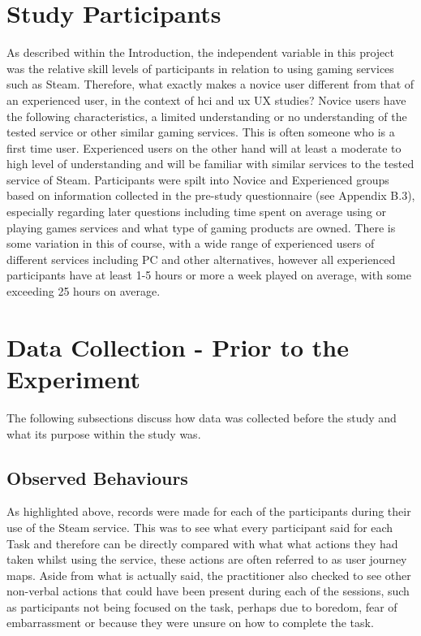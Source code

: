 \section{Study Participants}
As described within the Introduction, the independent variable in this project was the relative skill levels of participants in relation to using gaming services such as Steam. Therefore, what exactly makes a novice user different from that of an experienced user, in the context of \gls{hci} and \gls{ux} UX studies? Novice users have the following characteristics, a limited understanding or no understanding of the tested service or other similar gaming services. This is often someone who is a first time user. Experienced users on the other hand will at least a moderate to high level of understanding and will be familiar with similar services to the tested service of Steam. Participants were spilt into Novice and Experienced groups based on information collected in the pre-study questionnaire (see Appendix B.3), especially regarding later questions including time spent on average using or playing games services and what type of gaming products are owned. There is some variation in this of course, with a wide range of experienced users of different services including PC and other alternatives, however all experienced participants have at least 1-5 hours or more a week played on average, with some exceeding 25 hours on average. 

\section{Data Collection - Prior to the Experiment}
The following subsections discuss how data was collected before the study and what its purpose within the study was. 

\subsection{Observed Behaviours}
As highlighted above, records were made for each of the participants during their use of the Steam service. This was to see what every participant said for each Task and therefore can be directly compared with what what actions they had taken whilst using the service, these actions are often referred to as user journey maps. Aside from what is actually said, the practitioner also checked to see other non-verbal actions that could have been present during each of the sessions, such as participants not being focused on the task, perhaps due to boredom, fear of embarrassment or because they were unsure on how to complete the task.

